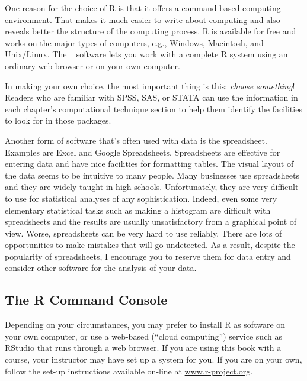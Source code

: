 One reason for the choice of R is that it offers a command-based
computing environment.  That makes it much easier to write about
computing and also reveals better the structure of the computing
process.\cite{kaplan-tise-2007} 
R is available for free and works on the
major types of computers, e.g., Windows, Macintosh, and
Unix/Linux. The \Rstudio~ software lets you work with a complete R
system using an ordinary web browser or on your own computer.  


In making your own choice, the most important thing is this: {\em choose 
  something}!    Readers who are familiar with SPSS, SAS, or STATA can
use the information in each chapter's computational technique section
to help them identify the facilities to look for in those packages.

Another form of software that's often used with data
is the spreadsheet.  Examples are Excel  and Google Spreadsheets.
Spreadsheets are 
effective for entering data and have nice facilities for formatting
tables.  The visual layout of the
data seems to be intuitive to many people.  Many businesses use spreadsheets
and they are widely taught in high schools.  Unfortunately, they are very
difficult to use for statistical analyses of any sophistication.
Indeed, even some very elementary statistical tasks 
such as making a histogram are difficult with spreadsheets
and the results are usually unsatisfactory from a
graphical point of view.
Worse, spreadsheets can be very hard to use reliably.  There are lots of
opportunities to make mistakes that will go undetected.
As a result, despite the popularity of spreadsheets, I encourage you to
reserve them for data entry and consider other software for the
analysis of your data.

\subsection{The R Command Console}

Depending on your circumstances, you may prefer to install R as
software on your own computer, or use a web-based (``cloud
computing'') service such as RStudio that runs through a web browser.  
If you are using this book with a course, your instructor may 
have set up a system for you.  If you are on your own, follow the set-up
instructions available on-line at \url{www.r-project.org}.

